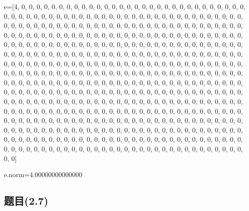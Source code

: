 \documentclass[12pt,a4paper]{article}
\numberwithin{equation}{section}
\begin{document}
\hspace*{\fill}

e=[4, 0, 0, 0, 0, 0, 0, 0, 0, 0, 0, 0, 0, 0, 0, 0, 0, 0, 0, 0, 0, 0, 0, 0, 0, 0, 0, 0, 0, 0, 0, 0, 0, 0, 0, 0, 0, 0, 0, 0, 0, 0, 0, 0, 0, 0, 0, 0, 0, 0, 0, 0, 0, 0, 0, 0, 0, 0, 0, 0, 0, 0, 0, 0, 0, 0, 0, 0, 0, 0, 0, 0, 0, 0, 0, 0, 0, 0, 0, 0, 0, 0, 0, 0, 0, 0, 0, 0, 0, 0, 0, 0, 0, 0, 0, 0, 0, 0, 0, 0, 0, 0, 0, 0, 0, 0, 0, 0, 0, 0, 0, 0, 0, 0, 0, 0, 0, 0, 0, 0, 0, 0, 0, 0, 0, 0, 0, 0, 0, 0, 0, 0, 0, 0, 0, 0, 0, 0, 0, 0, 0, 0, 0, 0, 0, 0, 0, 0, 0, 0, 0, 0, 0, 0, 0, 0, 0, 0, 0, 0, 0, 0, 0, 0, 0, 0, 0, 0, 0, 0, 0, 0, 0, 0, 0, 0, 0, 0, 0, 0, 0, 0, 0, 0, 0, 0, 0, 0, 0, 0, 0, 0, 0, 0, 0, 0, 0, 0, 0, 0, 0, 0, 0, 0, 0, 0, 0, 0, 0, 0, 0, 0, 0, 0, 0, 0, 0, 0, 0, 0, 0, 0, 0, 0, 0, 0, 0, 0, 0, 0, 0, 0, 0, 0, 0, 0, 0, 0, 0, 0, 0, 0, 0, 0, 0, 0, 0, 0, 0, 0, 0, 0, 0, 0, 0, 0, 0, 0, 0, 0, 0, 0, 0, 0, 0, 0, 0, 0, 0, 0, 0, 0, 0, 0, 0, 0, 0, 0, 0, 0, 0, 0, 0, 0, 0, 0, 0, 0, 0, 0, 0, 0, 0, 0, 0, 0, 0, 0, 0, 0, 0, 0, 0, 0, 0, 0, 0, 0, 0, 0, 0, 0, 0, 0, 0, 0, 0, 0, 0, 0, 0, 0, 0, 0, 0, 0, 0, 0, 0, 0, 0, 0, 0, 0, 0, 0, 0, 0, 0, 0, 0, 0, 0, 0, 0, 0, 0, 0, 0, 0, 0, 0, 0, 0, 0, 0, 0, 0, 0, 0, 0, 0, 0, 0, 0, 0, 0, 0, 0, 0, 0, 0, 0, 0, 0, 0, 0, 0, 0, 0, 0, 0, 0, 0, 0, 0, 0, 0, 0, 0, 0, 0, 0, 0, 0, 0, 0, 0, 0, 0, 0, 0, 0, 0, 0, 0, 0, 0, 0, 0, 0, 0, 0, 0, 0, 0, 0, 0, 0, 0, 0, 0, 0, 0, 0, 0, 0, 0, 0, 0, 0, 0, 0, 0, 0, 0, 0, 0, 0, 0, 0, 0, 0, 0, 0, 0, 0, 0, 0, 0, 0, 0, 0, 0, 0, 0, 0, 0, 0, 0, 0, 0, 0, 0, 0, 0, 0, 0, 0, 0, 0, 0, 0, 0, 0, 0, 0, 0, 0, 0, 0, 0, 0, 0, 0, 0, 0, 0, 0, 0, 0, 0, 0, 0, 0, 0, 0, 0, 0, 0, 0, 0, 0, 0, 0, 0, 0, 0, 0, 0, 0, 0, 0]

e.norm=4.00000000000000

\subsection{题目(2.7)}
\end{document}
